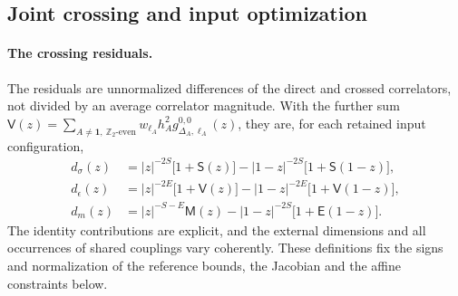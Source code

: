 \documentclass[11pt,a4paper]{article}
\numberwithin{equation}{section}
\begin{document}
\subsection{Joint crossing and input optimization}\label{app:cone:optimization}
\paragraph{The crossing residuals.} The residuals are unnormalized differences of the direct and crossed correlators,
not divided by an average correlator magnitude. With the further sum
$\mathsf V(z)=\sum_{A\ne\mathbf 1,\ \mathbb Z_2\text{-even}}w_{\ell_A}h_A^2g_{\Delta_A,\ell_A}^{0,0}(z)$, they are, for
each retained input configuration,
\begin{equation}
\begin{aligned}
 d_\sigma(z)&=|z|^{-2S}\bigl[1+\mathsf S(z)\bigr]-|1-z|^{-2S}\bigl[1+\mathsf S(1-z)\bigr],\\
 d_\epsilon(z)&=|z|^{-2E}\bigl[1+\mathsf V(z)\bigr]-|1-z|^{-2E}\bigl[1+\mathsf V(1-z)\bigr],\\
 d_m(z)&=|z|^{-S-E}\mathsf M(z)-|1-z|^{-2S}\bigl[1+\mathsf E(1-z)\bigr].
\end{aligned}
 \label{eq:cone:residuals}
\end{equation}
The identity contributions are explicit, and the external dimensions and all occurrences of shared couplings vary
coherently. These definitions fix the signs and normalization of the reference bounds, the Jacobian and the affine
constraints below.
\end{document}
